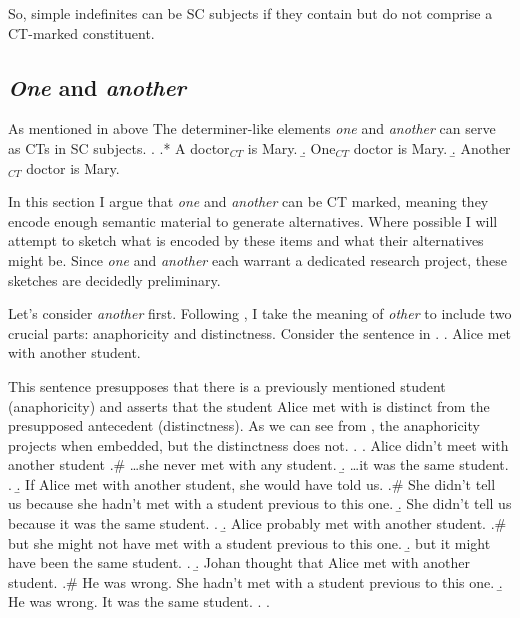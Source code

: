 \documentclass[GPFinal]{subfiles}
\begin{document}
So, simple indefinites can be SC subjects if they contain but do not comprise a CT-marked constituent.
\subsection{\textit{One} and \textit{another}}
As mentioned in above The determiner-like elements \textit{one} and \textit{another} can serve as CTs in SC subjects.
\ex.\label{ex:AONeAnother}
\a.* A doctor$_{CT}$ is Mary.
\b.\label{ex:OneCT} One$_{CT}$ doctor is Mary.
\b.\label{ex:AnotherCT} Another$_{CT}$ doctor is Mary.

In this section I argue that \textit{one} and \textit{another} can be CT marked, meaning they encode enough semantic material to generate alternatives.
Where possible I will attempt to sketch what is encoded by these items and what their alternatives might be.
Since \textit{one} and \textit{another} each warrant a dedicated research project, these sketches are decidedly preliminary.

Let's consider \textit{another} first.
Following \textcite{heim1991reciprocity}, I take the meaning of  \textit{other} to include two crucial parts: anaphoricity and distinctness.
Consider the sentence in \Next.
\ex. Alice met with another student.

This sentence presupposes that there is a previously mentioned student (anaphoricity) and asserts that the student Alice met with is distinct from the presupposed antecedent (distinctness). 
As we can see from \Next, the anaphoricity projects when embedded, but the distinctness does not.
\ex.
\a. Alice didn't meet with another student
\a.\# \dots she never met with any student.
\b. \dots it was the same student.
\z.
\b. If Alice met with another student, she would have told us.
\a.\# She didn't tell us because she hadn't met with a student previous to this one.
\b. She didn't tell us because it was the same student.
\z.
\b. Alice probably met with another student.
\a.\# but she might not have met with a student previous to this one.
\b. but it might have been the same student. 
\z.
\b. Johan thought that Alice met with another student.
\a.\# He was wrong. She hadn't met with a student previous to this one.
\b. He was wrong. It was the same student.
\z.
\z.
\end{document}
